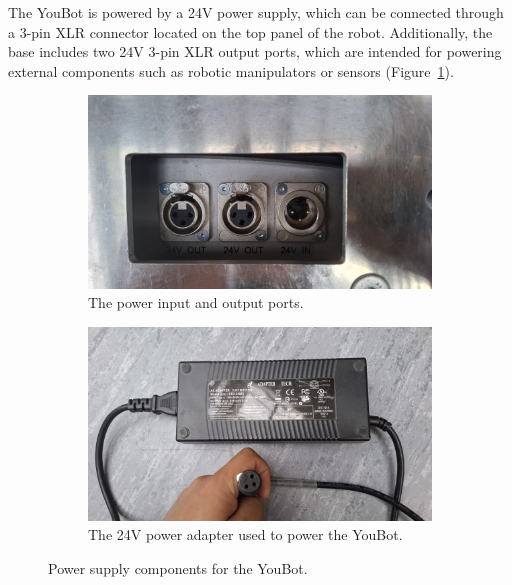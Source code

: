 \documentclass[a4paper, 12pt]{article}
\begin{document}
    The YouBot is powered by a 24V power supply, which can be connected through a 3-pin XLR connector located on the top panel of the robot. Additionally, the base includes two 24V 3-pin XLR output ports, which are intended for powering external components such as robotic manipulators or sensors (Figure~\ref{fig:youbot-power}).

    \begin{figure}[H]
        \centering
        \begin{subfigure}[t]{0.49\linewidth}
            \centering
            \includegraphics[width=\linewidth]{images/sec2/youbot_power.jpg}
            \caption{The power input and output ports.}
            \label{fig:youbot-power}
        \end{subfigure}
        \hfill
        \begin{subfigure}[t]{0.49\linewidth}
            \centering
            \includegraphics[width=\linewidth]{images/sec2/power_adapter.jpg}
            \caption{The 24V power adapter used to power the YouBot.}
        \end{subfigure}
        \caption{Power supply components for the YouBot.}
    \end{figure}
\end{document}

